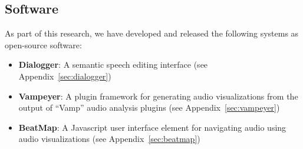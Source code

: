 \subsection*{Software}
As part of this research, we have developed and released the following systems as open-source software:

\begin{itemize}
  \item \textbf{Dialogger}: A semantic speech editing interface (see Appendix~\ref{sec:dialogger})
  \item \textbf{Vampeyer}: A plugin framework for generating audio visualizations from the output of ``Vamp'' audio
    analysis plugins (see Appendix~\ref{sec:vampeyer})
  \item \textbf{BeatMap}: A Javascript user interface element for navigating audio using audio visualizations
    (see Appendix~\ref{sec:beatmap})
\end{itemize}

